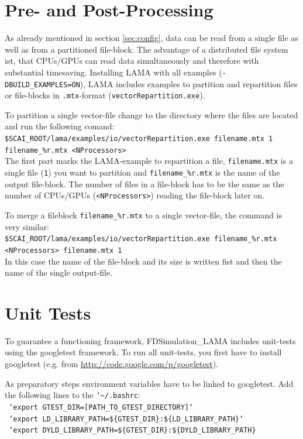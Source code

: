 \documentclass[pdftex,a4paper,parskip,listof=totoc,bibliography=totoc,onehalfspacing,12pt]{scrreprt}
\newcommand{\shellcmd}[1]{\indent\indent\texttt{#1}}	%
\newcommand{\shellcmdline}[1]{\indent\indent\texttt{\quad#1}} 	%
\begin{document}
\clearpage
\section{Pre- and Post-Processing}\label{sec:process}

As already mentioned in section \ref{sec:config}, data can be read from a single file as well as from a partitioned file-block. The advantage of a distributed file system ist, that CPUs/GPUs can read data simultaneously and therefore with substantial timesaving. Installing LAMA with all examples (\shellcmd{-DBUILD\_EXAMPLES=ON}), LAMA includes examples to partition and repartition files or file-blocks in \shellcmd{.mtx}-format (\shellcmd{vectorRepartition.exe}). 

To partition a single vector-file change to the directory where the files are located and run the following comand:  \\
\shellcmdline{\$SCAI\_ROOT/lama/examples/io/vectorRepartition.exe filename.mtx 1 }\\
\shellcmdline{filename\_\%r.mtx <NProcessors>}\\
The first part marks the LAMA-example to repartition a file, \shellcmd{filename.mtx} is a single file (\shellcmd{1}) you want to partition and \shellcmd{filename\_\%r.mtx} is the name of the output file-block. The number of files in a file-block has to be the same as the number of CPUs/GPUs (\shellcmd{<NProcessors>}) reading the file-block later on. 

To merge a fileblock \shellcmd{filename\_\%r.mtx} to a single vector-file, the command is very similar:\\
\shellcmdline{\$SCAI\_ROOT/lama/examples/io/vectorRepartition.exe filename\_\%r.mtx}\\
\shellcmdline{<NProcessors> filename.mtx 1}\\
In this case the name of the file-block and its size is written fist and then the name of the single output-file.

\section{Unit Tests}
To guarantee a functioning framework, FDSimulation\_LAMA includes unit-tests using the googletest framework. To run all unit-tests, you first have to install googletest (e.g. from \url{http://code.google.com/p/googletest}). 

As preparatory steps environment variables have to be linked to googletest. Add the following lines to the \shellcmd{{\char`\~}/.bashrc}:
\\\shellcmdline{ `export GTEST\_DIR=[PATH\_TO\_GTEST\_DIRECTORY]`}
\\\shellcmdline{ `export LD\_LIBRARY\_PATH=\$\{GTEST\_DIR\}:\$\{LD\_LIBRARY\_PATH\}`}
\\\shellcmdline{ `export DYLD\_LIBRARY\_PATH=\$\{GTEST\_DIR\}:\$\{DYLD\_LIBRARY\_PATH\}}
\end{document}
